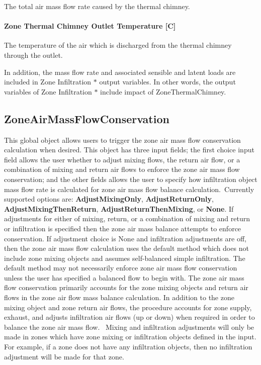 The total air mass flow rate caused by the thermal chimney.

\paragraph{Zone Thermal Chimney Outlet Temperature {[}C{]}}\label{zone-thermal-chimney-outlet-temperature-c}

The temperature of the air which is discharged from the thermal chimney through the outlet.

In addition, the mass flow rate and associated sensible and latent loads are included in Zone Infiltration $*$ output variables. In other words, the output variables of Zone Infiltration $*$ include impact of ZoneThermalChimney.

\subsection{ZoneAirMassFlowConservation}\label{zoneairmassflowconservation}

This global object allows users to trigger the zone air mass flow conservation calculation when desired. This object has three input fields; the first choice input field allows the user whether to adjust mixing flows, the return air flow, or a combination of mixing and return air flows to enforce the zone air mass flow conservation; and the other fields allows the user to specify how infiltration object mass flow rate is calculated for zone air mass flow balance calculation.~Currently supported options are: \textbf{AdjustMixingOnly}, \textbf{AdjustReturnOnly}, \textbf{AdjustMixingThenReturn}, \textbf{AdjustReturnThenMixing}, or \textbf{None}. If adjustments for either of mixing, return, or a combination of mixing and return or infiltration is specified then the zone air mass balance attempts to enforce conservation. If adjustment choice is None and infiltration adjustments are off, then the zone air mass flow calculation uses the default method which does not include zone mixing objects and assumes self-balanced simple infiltration. The default method may not necessarily enforce zone air mass flow conservation unless the user has specified a balanced flow to begin with. The zone air mass flow conservation primarily accounts for the zone mixing objects and return air flows in the zone air flow mass balance calculation. In addition to the zone mixing object and zone return air flows, the procedure accounts for zone supply, exhaust, and adjusts infiltration air flows (up or down) when required in order to balance the zone air mass flow.~ Mixing and infiltration adjustments will only be made in zones which have zone mixing or infiltration objects defined in the input. For example, if a zone does not have any infiltration objects, then no infiltration adjustment will be made for that zone.

